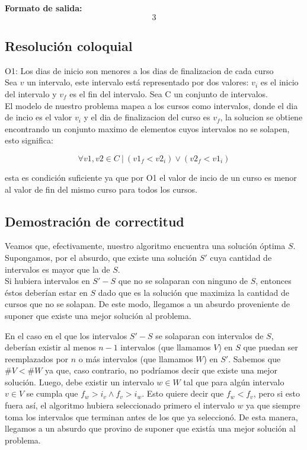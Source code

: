 \textbf{Formato de salida:}
$$3$$

\subsection{Resolución coloquial}

O1: Los dias de inicio son menores a los dias de finalizacion de cada curso\\

Sea $v$ un intervalo, este intervalo está representado por dos valores: $v_{i}$ es el inicio del intervalo y $v_{f}$ es el fin del intervalo. Sea C un conjunto de intervalos.\\

El modelo de nuestro problema mapea a los cursos como intervalos, donde el dia de incio es el valor $v_{i}$ y el dia de finalizacion del curso es $v_{f}$, la solucion se obtiene encontrando un conjunto maximo de elementos cuyos intervalos no se solapen, esto significa: 

\par{$$\forall v1, v2 \in C\ |\ (v1_{f} < v2_{i}) \vee (v2_{f} < v1_{i})$$} 

esta es condición suficiente ya que por O1 el valor de incio de un curso es menor al valor de fin del mismo curso para todos los cursos.

\subsection{Demostración de correctitud}

Veamos que, efectivamente, nuestro algoritmo encuentra una solución óptima $S$. Supongamos, por el absurdo, que existe una solución $S'$ cuya cantidad de intervalos es mayor que la de $S$.\\ Si hubiera intervalos en $S' - S$ que no se solaparan con ninguno de $S$, entonces éstos deberían estar en $S$ dado que es la solución que maximiza la cantidad de cursos que no se solapan. De este modo, llegamos a un absurdo proveniente de suponer que existe una mejor solución al problema.

\par{En el caso en el que los intervalos $S' - S$ se solaparan con intervalos de $S$, deberían existir al menos $n-1$ intervalos (que llamamos $V$) en $S$ que puedan ser reemplazados por $n$ o más intervalos (que llamamos $W$) en $S'$. Sabemos que $\#V < \#W$ ya que, caso contrario, no podríamos decir que existe una mejor solución. Luego, debe existir un intervalo $w \in W$ tal que para algún intervalo $v \in V$ se cumpla que $f_{w} > i_{v} \land f_{v} > i_{w}$. Esto quiere decir que $f_{w} < f_{v}$, pero si esto fuera así, el algoritmo hubiera seleccionado primero el intervalo $w$ ya que siempre toma los intervalos que terminan antes de los que ya seleccionó. De esta manera, llegamos a un absurdo que provino de suponer que existía una mejor solución al problema.}



